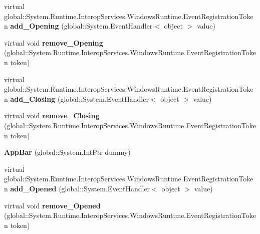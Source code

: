 \begin{DoxyCompactItemize}
virtual global\+::\+System.\+Runtime.\+Interop\+Services.\+Windows\+Runtime.\+Event\+Registration\+Token {\bfseries add\+\_\+\+Opening} (global\+::\+System.\+Event\+Handler$<$ object $>$ value)
\item 
\mbox{\label{class_windows_1_1_u_i_1_1_xaml_1_1_controls_1_1_app_bar_a1912d3027c4521c8dcda380a853d656e}} 
virtual void {\bfseries remove\+\_\+\+Opening} (global\+::\+System.\+Runtime.\+Interop\+Services.\+Windows\+Runtime.\+Event\+Registration\+Token token)
\item 
\mbox{\label{class_windows_1_1_u_i_1_1_xaml_1_1_controls_1_1_app_bar_a669f99f9098da8948468675637292c38}} 
virtual global\+::\+System.\+Runtime.\+Interop\+Services.\+Windows\+Runtime.\+Event\+Registration\+Token {\bfseries add\+\_\+\+Closing} (global\+::\+System.\+Event\+Handler$<$ object $>$ value)
\item 
\mbox{\label{class_windows_1_1_u_i_1_1_xaml_1_1_controls_1_1_app_bar_a4c8dc6e33234645dfc8de750f6172acc}} 
virtual void {\bfseries remove\+\_\+\+Closing} (global\+::\+System.\+Runtime.\+Interop\+Services.\+Windows\+Runtime.\+Event\+Registration\+Token token)
\item 
\mbox{\label{class_windows_1_1_u_i_1_1_xaml_1_1_controls_1_1_app_bar_a7504764229ad22d4e22e97ea76d33d92}} 
{\bfseries App\+Bar} (global\+::\+System.\+Int\+Ptr dummy)
\item 
\mbox{\label{class_windows_1_1_u_i_1_1_xaml_1_1_controls_1_1_app_bar_ad5f3931660e32abe22fcee131b86c49d}} 
virtual global\+::\+System.\+Runtime.\+Interop\+Services.\+Windows\+Runtime.\+Event\+Registration\+Token {\bfseries add\+\_\+\+Opened} (global\+::\+System.\+Event\+Handler$<$ object $>$ value)
\item 
\mbox{\label{class_windows_1_1_u_i_1_1_xaml_1_1_controls_1_1_app_bar_ac34208d86f3483385078caf53adad003}} 
virtual void {\bfseries remove\+\_\+\+Opened} (global\+::\+System.\+Runtime.\+Interop\+Services.\+Windows\+Runtime.\+Event\+Registration\+Token token)

\end{DoxyCompactItemize}
